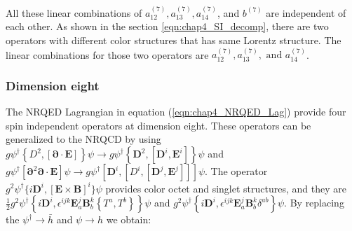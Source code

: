 All these linear combinations of $a_{12}^{(7)}, a_{13}^{(7)}, a_{14}^{(7)}$, and $ b^{(7)}$ are independent of each other. As shown in the section \ref{eqn:chap4_SI_decomp}, there are two operators with different color structures that has same Lorentz structure. The linear combinations for those two operators are $a_{12}^{(7)}, a_{13}^{(7)},\text{ and } a_{14}^{(7)}$.
\vspace{-1.5cm}
\subsubsection{Dimension eight}\label{subsec:dim_8_HQET_SI}
\vspace{-0.2cm}
The NRQED Lagrangian in equation (\ref{eqn:chap4_NRQED_Lag}) provide four spin independent operators at dimension eight. These operators can be generalized to the NRQCD by using $g \psi^{\dagger}\left\{D^{2},[\bm{\partial} \cdot \bm{E}]\right\} \psi \to g \psi^{\dagger}\left\{\bm{D}^{2},\left[\bm{D}^{i}, \bm{E}^{i}\right]\right\} \psi$ and $g \psi^{\dagger}\left[\bm{\partial}^{2} \bm{\partial} \cdot \bm{E}\right] \psi \to g\psi^{\dagger}[\bm{D}^i,[D^i,[\bm{D}^j,\bm{E}^j]]]\psi$. The operator $g^2\psi^{\dagger}\lbrace i\bm{D}^i,[\bm{E}\times\bm{B}]^i\rbrace\psi$ provides color octet and singlet structures, and they are $\frac{1}{2} g^{2} \psi^{\dagger}\left\{i \bm{D}^{i}, \epsilon^{i j k} \bm{E}_{a}^{j} \bm{B}_{b}^{k}\left\{T^{a}, T^{b}\right\}\right\} \psi$ and $g^{2} \psi^{\dagger}\left\{i \bm{D}^{i}, \epsilon^{i j k} \bm{E}_{a}^{j} \bm{B}_{b}^{k} \delta^{a b}\right\} \psi$. By replacing the $\psi^{\dagger}\to \bar{h}$ and $\psi\to h$ we obtain:

